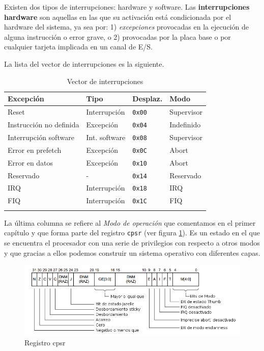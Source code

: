 Existen dos tipos de interrupciones: hardware y software. Las {\bf
interrupciones hardware} son aquellas en las que su activación está
condicionada por el hardware del sistema, ya sea por: 1) {\it
excepciones} provocadas en la ejecución de alguna instrucción o error
grave, o 2) provocadas por la placa base o por cualquier tarjeta
implicada en un canal de E/S.

\noindent La lista del vector de interrupciones es la siguiente.

\newpage
\begin{longtable}{ p{4.5cm} | p{2.5cm} | p{2cm} | p{4cm}}
\hline
{\bf Excepción} & {\bf Tipo} & {\bf Desplaz.} & {\bf Modo} \\ \hline
Reset                   & Interrupción & {\tt 0x00} & Supervisor \\ \hline
Instrucción no definida & Excepción & {\tt 0x04} & Indefinido \\ \hline
Interrupción software   & Int. software & {\tt 0x08} & Supervisor \\ \hline
Error en prefetch       & Excepción & {\tt 0x0C} & Abort \\ \hline
Error en datos          & Excepción & {\tt 0x10} & Abort \\ \hline
Reservado               & - & {\tt 0x14} & Reservado \\ \hline
IRQ                     & Interrupción & {\tt 0x18} & IRQ \\ \hline
FIQ                     & Interrupción & {\tt 0x1C} & FIQ \\ \hline
\caption{Vector de interrupciones}
\label{tab:excepciones}
\end{longtable}

La última columna se refiere al {\it Modo de operación} que comentamos en el primer
capítulo y que forma parte del registro {\tt cpsr} (ver figura \ref{fig:cpsr}).
Es un estado en el que se encuentra el procesador con una serie de privilegios
con respecto a otros modos y que gracias a ellos podemos construir un sistema operativo
con diferentes capas.

\begin{figure}[h]
  \centering
    \includegraphics[width=14cm]{graphs/cpsr.png}
  \caption{Registro cpsr}
  \label{fig:cpsr}
\end{figure}

